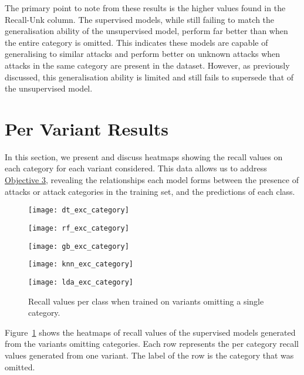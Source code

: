 The primary point to note from these results is the higher values found in the
Recall-Unk column. The supervised models, while still failing to match the
generalisation ability of the unsupervised model, perform far better than when
the entire category is omitted. This indicates these models are capable of
generalising to similar attacks and perform better on unknown attacks when
attacks in the same category are present in the dataset. However, as previously
discussed, this generalisation ability is limited and still fails to supersede
that of the unsupervised model.

\section{Per Variant Results}%
\label{sec:res_var}

In this section, we present and discuss heatmaps showing the recall values on
each category for each variant considered. This data allows us to address
\hyperlink{obj}{Objective 3}, revealing the relationships each model forms
between the presence of attacks or attack categories in the training set, and
the predictions of each class.

%
\begin{figure}[htbp]
    \centering
    \begin{minipage}[h]{0.5\textwidth}
        \centering
        \texttt{[image: dt\_exc\_category]}
    \end{minipage}\hfill
    \begin{minipage}[h]{0.5\textwidth}
        \centering
        \texttt{[image: rf\_exc\_category]}
    \end{minipage}
    \begin{minipage}[h]{0.5\textwidth}
        \centering
        \texttt{[image: gb\_exc\_category]}
    \end{minipage}\hfill
    \begin{minipage}[h]{0.5\textwidth}
        \centering
        \texttt{[image: knn\_exc\_category]}
    \end{minipage}
    \begin{minipage}[h]{0.5\textwidth}
        \centering
        \texttt{[image: lda\_exc\_category]}
    \end{minipage}
    \caption[Category Omission Results]{Recall values per class when trained on variants omitting a single category.\label{fig:exc_cat}}
\end{figure}
% 
Figure~\ref{fig:exc_cat} shows the heatmaps of recall values of the supervised
models generated from the variants omitting categories. Each row represents the
per category recall values generated from one variant. The label of the row is
the category that was omitted.

